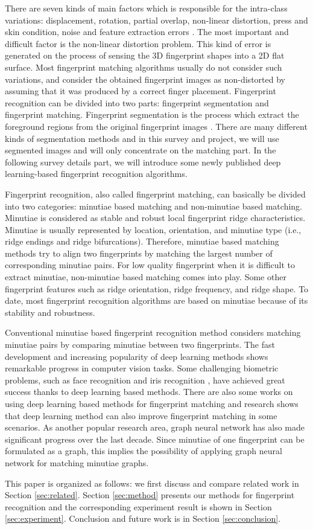 There are seven kinds of main factors which is responsible for the intra-class variations: displacement, rotation, partial overlap, non-linear distortion, press and skin condition,  noise and feature extraction errors \cite{Maltoni2009}.
The most important and difficult factor is the non-linear distortion problem. This kind of error is generated on the process of sensing  the 3D fingerprint shapes into a 2D flat surface. Most fingerprint matching algorithms usually do not consider such variations, and consider the obtained fingerprint images as non-distorted by assuming that it was produced by a correct finger placement. Fingerprint recognition can be divided into two parts: fingerprint segmentation and fingerprint matching. Fingerprint segmentation is the process which extract the foreground regions from the original fingerprint images \cite{Maltoni2009}. There are many different kinds of segmentation methods and in this survey and project, we will use segmented images and will only concentrate on the matching part. In the following survey details  part, we will introduce some newly published deep learning-based fingerprint recognition algorithms.

Fingerprint recognition, also called fingerprint matching, can basically be divided into two categories: minutiae based matching and non-minutiae based matching. Minutiae is considered as stable and robust local fingerprint ridge characteristics. Minutiae is usually represented by location, orientation, and minutiae type (i.e., ridge endings and ridge bifurcations). Therefore, minutiae based matching methods try to align two fingerprints by matching the largest number of corresponding minutiae pairs. For low quality fingerprint when it is difficult to extract minutiae, non-minutiae based matching comes into play. Some other fingerprint features such as ridge orientation, ridge frequency,  and ridge shape. To date, most fingerprint recognition algorithms are based on minutiae because of its stability and robustness.

Conventional minutiae based fingerprint recognition method considers matching minutiae pairs by comparing minutiae between two fingerprints. The fast development and increasing popularity of deep learning methods shows remarkable progress in computer vision tasks. Some challenging biometric problems, such as face recognition \cite{SchroffCVPR2015facenet} and iris recognition \cite{ZhaoICCV2017}, have achieved great success thanks to deep learning based methods. There are also some works on using deep learning based methods for fingerprint matching and research shows that deep learning method can also improve fingerprint matching in some scenarios. As another popular research area, graph neural network has also made significant progress over the last decade. Since minutiae of one fingerprint can be formulated as a graph, this implies the possibility of applying graph neural network for matching minutiae graphs. 

This paper is organized as follows: we first discuss and compare related work in Section \ref{sec:related}. Section \ref{sec:method} presents our methods for fingerprint recognition and the corresponding experiment result is shown in Section \ref{sec:experiment}. Conclusion and future work is in Section \ref{sec:conclusion}.